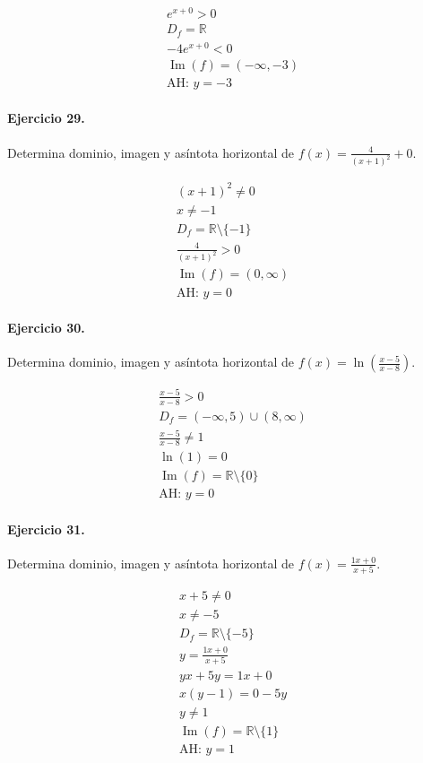 \documentclass[11pt,a4paper]{article}
\begin{document}
\[
\begin{aligned}
e^{x+0}>0\\
D_f=\mathbb{R}\\
-4e^{x+0}<0\\
\operatorname{Im}(f)=(-\infty,-3)\\
\text{AH: }y=-3
\end{aligned}
\]


\paragraph{Ejercicio 29.} Determina dominio, imagen y asíntota horizontal de $f(x)=\frac{4}{(x+1)^2}+0$.

\[
\begin{aligned}
(x+1)^2\ne0\\
x\ne -1\\
D_f=\mathbb{R}\setminus\{-1\}\\
\frac{4}{(x+1)^2}>0\\
\operatorname{Im}(f)=(0,\infty)\\
\text{AH: }y=0
\end{aligned}
\]


\paragraph{Ejercicio 30.} Determina dominio, imagen y asíntota horizontal de $f(x)=\ln\left(\frac{x-5}{x-8}\right)$.

\[
\begin{aligned}
\frac{x-5}{x-8} >0\\
D_f=(-\infty,5)\cup(8,\infty)\\
\frac{x-5}{x-8}\ne1\\
\ln(1)=0\\
\operatorname{Im}(f)=\mathbb{R}\setminus\{0\}\\
\text{{AH: }}y=0
\end{aligned}
\]


\paragraph{Ejercicio 31.} Determina dominio, imagen y asíntota horizontal de $f(x)=\frac{1x+0}{x+5}$.

\[
\begin{aligned}
x+5\ne0\\
x\ne -5\\
D_f=\mathbb{R}\setminus\{-5\}\\
y=\frac{1x+0}{x+5}\\
yx+5y=1x+0\\
x(y-1)=0-5y\\
y\ne 1\\
\operatorname{Im}(f)=\mathbb{R}\setminus\{1\}\\
\text{AH: }y=1
\end{aligned}
\]
\end{document}
